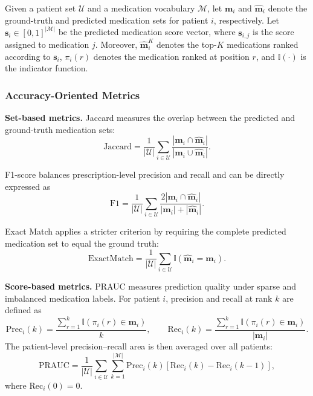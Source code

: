 \documentclass[manuscript,review]{acmart}
\begin{document}
Given a patient set $\mathcal{U}$ and a medication vocabulary $\mathcal{M}$, let $\mathbf{m}_i$ and $\hat{\mathbf{m}}_i$ denote the ground-truth and predicted medication sets for patient $i$, respectively. Let $\mathbf{s}_i\in[0,1]^{|\mathcal{M}|}$ be the predicted medication score vector, where $\mathbf{s}_{i,j}$ is the score assigned to medication $j$. Moreover, $\hat{\mathbf{m}}_i^K$ denotes the top-$K$ medications ranked according to $\mathbf{s}_i$, $\pi_i(r)$ denotes the medication ranked at position $r$, and $\mathbb{I}(\cdot)$ is the indicator function.

\subsubsection{Accuracy-Oriented Metrics}

\textbf{Set-based metrics.}
Jaccard measures the overlap between the predicted and ground-truth medication sets:
\begin{equation}
\mathrm{Jaccard}
=
\frac{1}{|\mathcal{U}|}
\sum_{i\in\mathcal{U}}
\frac{
|\mathbf{m}_i\cap\hat{\mathbf{m}}_i|
}{
|\mathbf{m}_i\cup\hat{\mathbf{m}}_i|
}.
\end{equation}

F1-score balances prescription-level precision and recall and can be directly expressed as
\begin{equation}
\mathrm{F1}
=
\frac{1}{|\mathcal{U}|}
\sum_{i\in\mathcal{U}}
\frac{
2|\mathbf{m}_i\cap\hat{\mathbf{m}}_i|
}{
|\mathbf{m}_i|+|\hat{\mathbf{m}}_i|
}.
\end{equation}

Exact Match applies a stricter criterion by requiring the complete predicted medication set to equal the ground truth:
\begin{equation}
\mathrm{ExactMatch}
=
\frac{1}{|\mathcal{U}|}
\sum_{i\in\mathcal{U}}
\mathbb{I}
\left(
\hat{\mathbf{m}}_i=\mathbf{m}_i
\right).
\end{equation}

\textbf{Score-based metrics.}
PRAUC measures prediction quality under sparse and imbalanced medication labels. For patient $i$, precision and recall at rank $k$ are defined as
\begin{equation}
\mathrm{Prec}_i(k)
=
\frac{
\sum_{r=1}^{k}
\mathbb{I}\left(\pi_i(r)\in\mathbf{m}_i\right)
}{k},
\qquad
\mathrm{Rec}_i(k)
=
\frac{
\sum_{r=1}^{k}
\mathbb{I}\left(\pi_i(r)\in\mathbf{m}_i\right)
}{
|\mathbf{m}_i|
}.
\end{equation}
The patient-level precision--recall area is then averaged over all patients:
\begin{equation}
\mathrm{PRAUC}
=
\frac{1}{|\mathcal{U}|}
\sum_{i\in\mathcal{U}}
\sum_{k=1}^{|\mathcal{M}|}
\mathrm{Prec}_i(k)
\left[
\mathrm{Rec}_i(k)-\mathrm{Rec}_i(k-1)
\right],
\end{equation}
where $\mathrm{Rec}_i(0)=0$.
\end{document}
